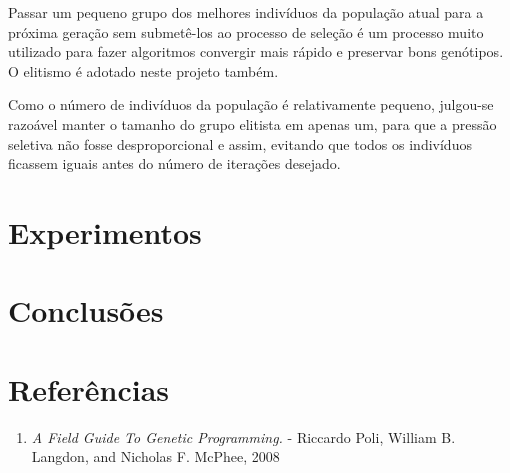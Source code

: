 \documentclass[11pt]{article}
\begin{document}
Passar um pequeno grupo dos melhores indivíduos da população atual para a próxima geração sem submetê-los ao processo de seleção é um processo muito utilizado para fazer algoritmos convergir mais rápido e preservar bons genótipos. O elitismo é adotado neste projeto também.

Como o número de indivíduos da população é relativamente pequeno, julgou-se razoável manter o tamanho do grupo elitista em apenas um, para que a pressão seletiva não fosse desproporcional e assim, evitando que todos os indivíduos ficassem iguais antes do número de iterações desejado.

\section{Experimentos}

\section{Conclusões}

\section{Referências}

\begin{enumerate}
	\item \textit{A Field Guide To Genetic Programming.} - Riccardo Poli, William B. Langdon, and Nicholas F. McPhee, 2008
\end{enumerate}
\end{document}
